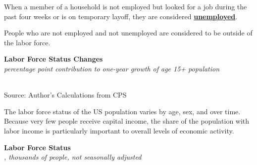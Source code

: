 \documentclass{report}
\makeatletter
\newcommand{\tbllink}[1]{\href{https://raw.githubusercontent.com/bdecon/US-chartbook/master/chartbook/data/#1}{\faTable}}
\newcommand*\short[1]{\expandafter\@gobbletwo\number\numexpr#1\relax}
\newcommand{\ctsbar}[5]{
		\addplot[ybar stacked, bar width=#5, draw opacity=0, fill=#1] 
			table [x=#2, y=#3, col sep=comma]{#4};}
\newcommand{\dateaxisticks}{
		date coordinates in=x, axis line style={draw=none},
		xmax={2021-06-15},
		max space between ticks=40,	    
		xtick={{1990-01-01}, {1992-01-01}, {1994-01-01}, 
			{1996-01-01}, {1998-01-01}, {2000-01-01}, 
			{2002-01-01}, {2004-01-01}, {2006-01-01},
			{2008-01-01}, {2010-01-01}, {2012-01-01}, {2014-01-01},
		    {2016-01-01}, {2018-01-01}, {2020-01-01}},
		minor xtick={{1989-01-01}, {1991-01-01}, {1993-01-01},
			{1995-01-01}, {1997-01-01}, {1999-01-01}, 
			{2001-01-01}, {2003-01-01}, {2005-01-01}, {2007-01-01},
		    {2009-01-01}, {2011-01-01}, {2013-01-01}, {2015-01-01},
		    {2017-01-01}, {2019-01-01}, {2021-01-01}},
		enlarge y limits={0.06}, enlarge x limits={0.01},
		}
\newcommand{\bbar}[2]{extra #1 ticks = {{#2}}, extra #1 tick labels = ,
		extra #1 tick style = {grid=major, grid style={thick, black!25}},}
\newcommand{\rbars}{
		\fill[color=black!10] (axis cs:{1990-07-01},\pgfkeysvalueof{/pgfplots/ymin}) rectangle 
			(axis cs:{1991-03-01}, \pgfkeysvalueof{/pgfplots/ymax});
		\fill[color=black!10] (axis cs:{2007-12-01},\pgfkeysvalueof{/pgfplots/ymin}) rectangle 
			(axis cs:{2009-07-01}, \pgfkeysvalueof{/pgfplots/ymax});
		\fill[color=black!10] (axis cs:{2001-03-01},\pgfkeysvalueof{/pgfplots/ymin}) rectangle 
			(axis cs:{2001-11-01}, \pgfkeysvalueof{/pgfplots/ymax});
		\fill[color=black!10] (axis cs:{2020-02-01},\pgfkeysvalueof{/pgfplots/ymin}) rectangle 
			(axis cs:{2021-06-15}, \pgfkeysvalueof{/pgfplots/ymax});}
\makeatother
\begin{document}
{\begin{minipage}{0.76\textwidth}
\small When a member of a household is not employed but looked for a job during the past four weeks or is on temporary layoff, they are considered \href{https://www.bls.gov/cps/cps_htgm.htm}{\textbf{unemployed}}. 

People who are not employed and not unemployed are considered to be outside of the labor force.  
\vspace{2mm}

\normalsize \textbf{Labor Force Status Changes}\\
\footnotesize{\textit{percentage point contribution to one-year growth of age 15+ population}}\\
\hspace*{-2mm} \\
\footnotesize{Source: Author's Calculations from CPS} \hfill \tbllink{cps_lfs2.csv}
\end{minipage}
\newpage
\begin{minipage}{0.76\textwidth}
\small The labor force status of the US population varies by age, sex, and over time. Because very few people receive capital income, the share of the population with labor income is particularly important to overall levels of economic activity. 
\vspace{1mm}

\normalsize \textbf{Labor Force Status}\\
\footnotesize{\textit{\unskip, thousands of people, not seasonally adjusted}}\\
\noindent {} \setlength{\tabcolsep}{3.0pt} \color{black!90}
		{\renewcommand{\arraystretch}{1.52}
		 \begin{tabular}{p{27.8mm} R{11.2mm} R{10.4mm} R{10.4mm} R{10.2mm} 
		 				 R{10.6mm} R{10.4mm} R{10.4mm}}
			  \hline
		\end{tabular}}
\vspace{-2mm}	
	

\end{minipage}}
\end{document}
